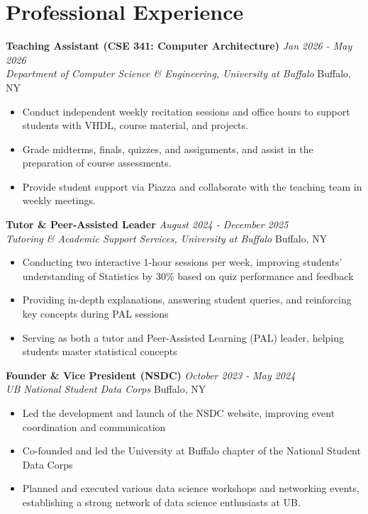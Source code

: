 \documentclass[11pt,a4paper]{article}
\begin{document}
\section*{Professional Experience}

\noindent
\textbf{Teaching Assistant (CSE 341: Computer Architecture)} \hfill \textit{Jan 2026 - May 2026} \\
\noindent
\textit{Department of Computer Science \& Engineering, University at Buffalo} \hfill Buffalo, NY
\begin{itemize}[nosep]
    \item Conduct independent weekly recitation sessions and office hours to support students with VHDL, course material, and projects.
    \item Grade midterms, finals, quizzes, and assignments, and assist in the preparation of course assessments.
    \item Provide student support via Piazza and collaborate with the teaching team in weekly meetings.
\end{itemize}
\vspace{2em}


\noindent
\textbf{Tutor \& Peer-Assisted Leader} \hfill \textit{August 2024 - December 2025} \\
\noindent
\textit{Tutoring \& Academic Support Services, University at Buffalo} \hfill Buffalo, NY
\begin{itemize}[nosep]
    \item Conducting two interactive 1-hour sessions per week, improving students' understanding of Statistics by 30\% based on quiz performance and feedback
    \item Providing in-depth explanations, answering student queries, and reinforcing key concepts during PAL sessions
    \item Serving as both a tutor and Peer-Assisted Learning (PAL) leader, helping students master statistical concepts
\end{itemize}

\noindent
\textbf{Founder \& Vice President (NSDC)} \hfill \textit{October 2023 - May 2024} \\
\noindent
\textit{UB National Student Data Corps} \hfill Buffalo, NY
\begin{itemize}[nosep]
    \item Led the development and launch of the NSDC website, improving event coordination and communication
    \item Co-founded and led the University at Buffalo chapter of the National Student Data Corps
    \item Planned and executed various data science workshops and networking events, establishing a strong network of data science enthusiasts at UB.
\end{itemize}
\end{document}
